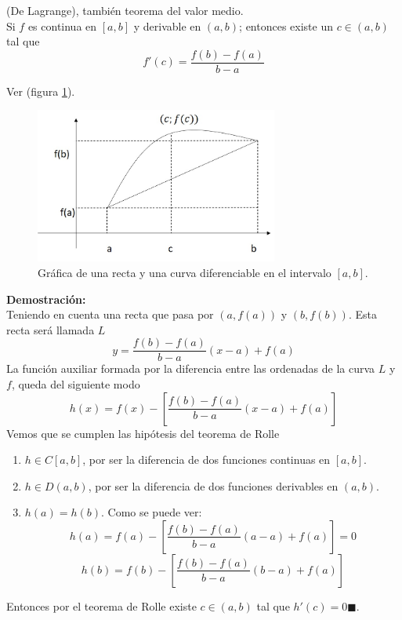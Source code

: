 \documentclass[10pt,twoside]{SelfArx} %
\begin{document}
 
  
 \begin{teorema}
 	(De Lagrange), también teorema del valor medio.\\
 	Si $ f $ es continua en $ [a,b] $ y derivable en $ (a,b) $; entonces existe un $ c\in(a,b) $ tal que 
 	\begin{equation}
 	f'(c)=\dfrac{f(b)-f(a)}{b-a}\label{valorMedio}
 	\end{equation}
  \end{teorema}
 Ver (figura \ref{lagrange1}).\\
 \begin{figure}[h]
 	\centering
 	\includegraphics[width=8cm]{lagrange1}
 	\caption{Gráfica de una recta y una curva diferenciable en el intervalo $ [a,b] $.}
 	\label{lagrange1}
 \end{figure}
 \textbf{Demostración:}\\
 Teniendo en cuenta una recta que pasa por $ (a,f(a)) $ y $ (b,f(b)) $. Esta recta será llamada $ L $
 \begin{equation}
 y=\dfrac{f(b)-f(a)}{b-a}(x-a)+f(a)
 \end{equation}
 La función auxiliar formada por la diferencia entre las ordenadas de la curva $ L $ y $ f $, queda del siguiente modo
 \begin{equation}
 h(x)=f(x)-\left [ \dfrac{f(b)-f(a)}{b-a}(x-a)+f(a)\right ]
 \end{equation}
 Vemos que se cumplen  las hipótesis del teorema de Rolle
 \begin{enumerate}
 	\item $ h\in C[a,b] $, por ser la diferencia de dos funciones continuas en $ [a,b] $.
 	\item $ h\in D(a,b) $, por ser la diferencia de dos funciones derivables en $ (a,b) $.
 	\item $ h(a)=h(b) $. 
 	Como se puede ver:
 	\[ h(a)=f(a)-\left [ \dfrac{f(b)-f(a)}{b-a}(a-a)+f(a)\right ]=0 \]
 	\[ h(b)=f(b)-\left [ \dfrac{f(b)-f(a)}{b-a}(b-a)+f(a)\right ] \]
 \end{enumerate}
 Entonces por el teorema de Rolle existe $ c\in(a,b) $ tal que $ h'(c)=0 \blacksquare$.\\
 
\end{document}
